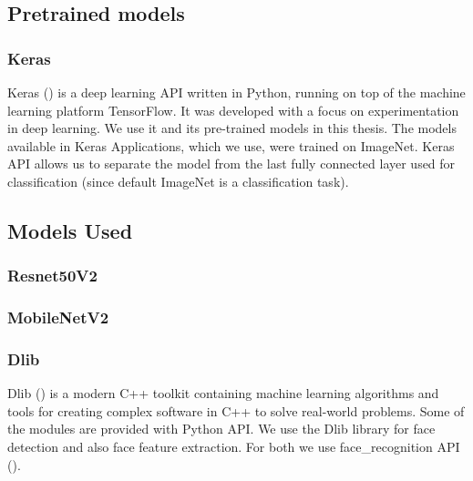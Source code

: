 \subsection{Pretrained models}
\label{ss:pretrained_models}

\subsubsection{Keras}

Keras (\cite{chollet2015keras}) is a deep learning API written in Python, running on top of the machine learning platform TensorFlow\cite{tensorflow2015-whitepaper}. It was developed with a focus on experimentation in deep learning. We use it and its pre-trained models in this thesis. The models available in Keras Applications, which we use, were trained on ImageNet. Keras API allows us to separate the model from the last fully connected layer used for classification (since default ImageNet is a classification task). 

\subsection{Models Used}

\subsubsection*{Resnet50V2}
\cite{resnetv2} \cite{resnet}

\subsubsection*{MobileNetV2}
\cite{mobilenet} \cite{mobilenetv2}

\subsubsection{Dlib}
Dlib (\cite{king2009dlib}) is a modern C++ toolkit containing machine learning algorithms and tools for creating complex software in C++ to solve real-world problems. Some of the modules are provided with Python API. We use the Dlib library for face detection and also face feature extraction. For both we use face\_recognition API (\cite{geitgey2016machine}). \cite{king2017high} 




